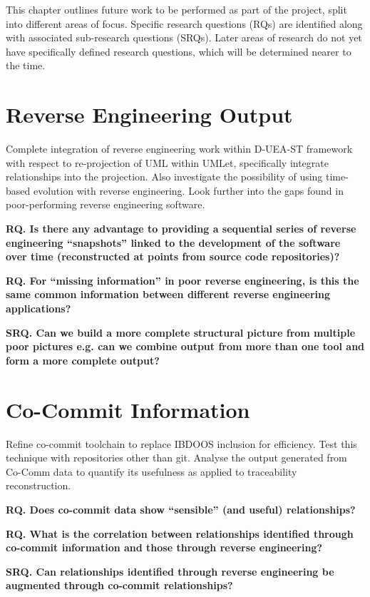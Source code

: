 This chapter outlines future work to be performed as part of the project, split into different areas of focus. Specific research questions (RQs) are identified along with associated sub-research questions (SRQs). Later areas of research do not yet have specifically defined research questions, which will be determined nearer to the time.

\section{Reverse Engineering Output}\label{future-reveng}

Complete integration of reverse engineering work within D-UEA-ST framework with respect to re-projection of UML within UMLet, specifically integrate relationships into the projection. Also investigate the possibility of using time-based evolution with reverse engineering. Look further into the gaps found in poor-performing reverse engineering software.

\textbf{RQ. Is there any advantage to providing a sequential series of reverse engineering ``snapshots'' linked to the development of the software over time (reconstructed at points from source code repositories)?}

\textbf{RQ. For ``missing information'' in poor reverse engineering, is this the same common information between different reverse engineering applications?}

\textbf{SRQ. Can we build a more complete structural picture from multiple poor pictures e.g. can we combine output from more than one tool and form a more complete output?}

\section{Co-Commit Information}\label{future-cocomm}

Refine co-commit toolchain to replace IBDOOS inclusion for efficiency. Test this technique with repositories other than git. Analyse the output generated from Co-Comm data to quantify its usefulness as applied to traceability reconstruction.

\textbf{RQ. Does co-commit data show ``sensible'' (and useful) relationships?}

\textbf{RQ. What is the correlation between relationships identified through co-commit information and those through reverse engineering?}

\textbf{SRQ. Can relationships identified through reverse engineering be augmented through co-commit relationships?}

